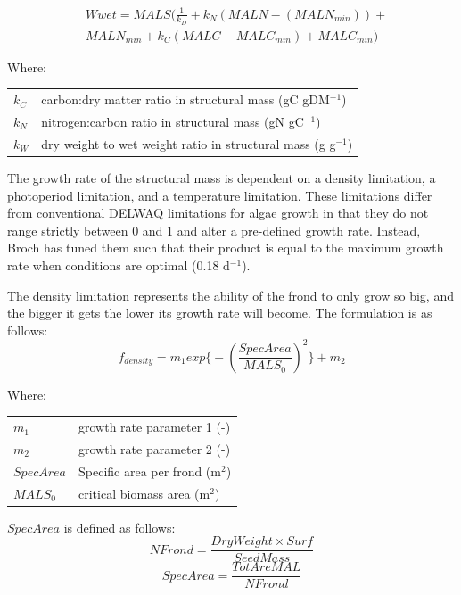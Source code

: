 \documentclass{deltares_manual}
\begin{document}
\begin{equation}
\begin{aligned}
&Wwet = MALS(\frac{1}{k_D} + k_N(MALN - (MALN_{min})) + \\
&MALN_{min} + k_C(MALC - MALC_{min}) + MALC_{min})
\end{aligned}
\end{equation}

Where:\\
\begin{tabular}{ll}
$k_C$        & carbon:dry matter ratio in structural mass (gC gDM$^{-1}$)\\
$k_N$        & nitrogen:carbon ratio in structural mass (gN gC$^{-1}$)\\
$k_W$        & dry weight to wet weight ratio in structural mass (g g$^{-1}$)\\
\end{tabular}
The growth rate of the structural mass is dependent on a density limitation, a photoperiod limitation, and a temperature limitation. These limitations differ from conventional DELWAQ limitations for algae growth in that they do not range strictly between 0 and 1 and alter a pre-defined growth rate. Instead, Broch has tuned them such that their product is equal to the maximum growth rate when conditions are optimal (0.18 d$^{-1}$). 

The density limitation represents the ability of the frond to only grow so big, and the bigger it gets the lower its growth rate will become. The formulation is as follows:
\begin{equation}
f_{density} = m_1 exp\big\{-(\frac{SpecArea}{MALS_0})^2 \big\}+m_2
\end{equation}

Where:\\

\begin{tabular}{ll}
	$m_1$    & growth rate parameter 1 (-)\\
	$m_2$    & growth rate parameter 2 (-)\\
	$SpecArea$ & Specific area per frond (m$^2$)\\
	$MALS_0$ & critical biomass area (m$^2$)\\
\end{tabular}

$SpecArea$ is defined as follows:\\

\begin{equation}
NFrond = \frac{DryWeight \times Surf}{SeedMass}
\end{equation}
\begin{equation}
SpecArea = \frac{TotAreMAL}{NFrond} 
\end{equation}
\end{document}
